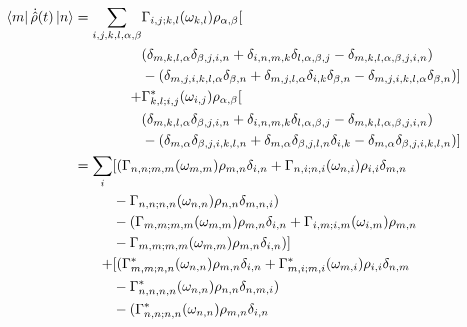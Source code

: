 \begin{align}
  \bra{m}\dot{\hat{\rho}}(t) \ket{n} & = \begin{aligned}[t]
    \sum_{i,j,k, l, \alpha, \beta} &
    \Gamma_{i,j;k, l}(\omega_{k,l})
    \rho_{\alpha, \beta} [                             \\
                                   &
      (\delta_{m, k, l, \alpha}\delta_{\beta, j,i, n}
      + \delta_{i, n, m, k}\delta_{l, \alpha, \beta, j}
    - \delta_{m, k, l, \alpha, \beta, j,i, n})         \\
                                   &
      - (    \delta_{m, j,i, k,l, \alpha}\delta_{\beta, n}
      + \delta_{m, j,l, \alpha}\delta_{i, k}\delta_{\beta, n}
    - \delta_{m, j,i, k, l, \alpha}\delta_{\beta, n})] \\
    +                              &
    \Gamma^*_{k, l; i,j}(\omega_{i,j})
    \rho_{\alpha, \beta} [                             \\
                                   &
      (\delta_{m, k, l, \alpha}\delta_{\beta, j,i, n}
      + \delta_{i, n, m, k}\delta_{l, \alpha, \beta, j}
    - \delta_{m, k, l, \alpha, \beta, j,i, n})         \\
                                   &
      - (\delta_{m, \alpha}\delta_{\beta, j,i, k, l, n}
      + \delta_{m, \alpha}\delta_{\beta, j,l, n}
      \delta_{i, k}
      - \delta_{m, \alpha}\delta_{\beta, j,i, k,l, n})]
  \end{aligned}  \\
                                     & = \begin{aligned}[t]
    \sum_{i} &
    [ (\Gamma_{n,n;m, m}(\omega_{m,m})\rho_{m, n}\delta_{i,n}
    + \Gamma_{n,i;n, i}(\omega_{n,i})\rho_{i, i}\delta_{m,n}     \\ &
    - \Gamma_{n,n;n,n}(\omega_{n,n})\rho_{n,n}\delta_{m,n,i})    \\
             &
        - (\Gamma_{m,m;m,m}(\omega_{m,m})\rho_{m, n}\delta_{i,n}
    +\Gamma_{i,m;i, m}(\omega_{i,m})\rho_{m, n}                  \\ &
    -\Gamma_{m,m;m,m}(\omega_{m,m})\rho_{m, n}\delta_{i,n})]     \\
    +        &
    [(\Gamma^*_{m,m; n,n}(\omega_{n,n})\rho_{m, n}\delta_{i,n}
    + \Gamma^*_{m,i; m,i}(\omega_{m,i})\rho_{i, i}\delta_{n, m}  \\ &
    - \Gamma^*_{n,n,n,n}(\omega_{n,n})\rho_{n,n}\delta_{n, m,i}) \\
             &
        - (\Gamma^*_{n,n;n,n}(\omega_{n,n})\rho_{m, n}\delta_{i,n}

\end{aligned}
\end{align}
